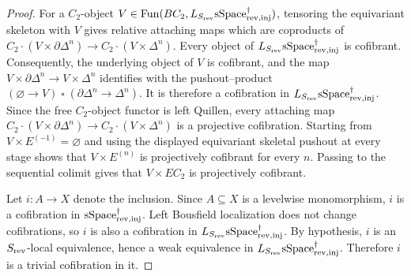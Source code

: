 \documentclass[a4paper,dvipdfmx,11pt]{amsart}
\begin{document}
\begin{proof}
  For a $C_2$-object $V\in\mathrm{Fun}(BC_{2},L_{S_{\mathrm{rev}}}\mathrm{sSpace}^{\dag}_{\mathrm{rev},\mathrm{inj}})$,
  tensoring the equivariant skeleton with $V$ gives relative attaching maps which are coproducts of $C_2\mathbin{\cdot}(V\times\partial\Delta^n) \to C_2\mathbin{\cdot}(V\times\Delta^n)$.
  Every object of $L_{S_{\mathrm{rev}}}\mathrm{sSpace}^{\dag}_{\mathrm{rev},\mathrm{inj}}$ is cofibrant.
  Consequently, the underlying object of $V$ is cofibrant, and the map $V\times\partial\Delta^n \to V\times\Delta^n$ identifies with the pushout--product $(\varnothing\to V) \mathbin{\square} (\partial\Delta^n\to\Delta^n)$.
  It is therefore a cofibration in $L_{S_{\mathrm{rev}}}\mathrm{sSpace}^{\dag}_{\mathrm{rev},\mathrm{inj}}$.
  Since the free $C_2$-object functor is left Quillen, every attaching map $C_2\mathbin{\cdot}(V\times\partial\Delta^n) \to  C_2\mathbin{\cdot}(V\times\Delta^n)$ is a projective cofibration.
  Starting from $V\times E^{(-1)}=\varnothing$ and using the displayed equivariant skeletal pushout at every stage shows that $V\times E^{(n)}$ is projectively cofibrant for every $n$.
  Passing to the sequential colimit gives that $V\times EC_2$ is projectively cofibrant.

  Let $i:A\to X$ denote the inclusion.
  Since $A\subseteq X$ is a levelwise monomorphism, $i$ is a cofibration in $\mathrm{sSpace}^{\dag}_{\mathrm{rev},\mathrm{inj}}$.
  Left Bousfield localization does not change cofibrations, so $i$ is also a cofibration in $L_{S_{\mathrm{rev}}}\mathrm{sSpace}^{\dag}_{\mathrm{rev},\mathrm{inj}}$.
  By hypothesis, $i$ is an $S_{\mathrm{rev}}$-local equivalence, hence a weak equivalence in $L_{S_{\mathrm{rev}}}\mathrm{sSpace}^{\dag}_{\mathrm{rev},\mathrm{inj}}$.
  Therefore $i$ is a trivial cofibration in it.


\end{proof}
\end{document}
